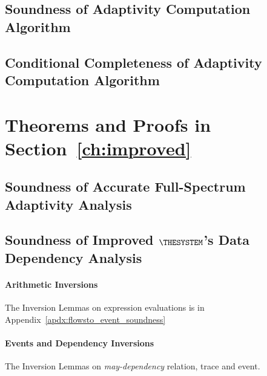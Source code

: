 \subsection{Soundness of Adaptivity Computation Algorithm}
\label{apdx:adaptalg_soundness}

\subsection{Conditional Completeness of Adaptivity Computation Algorithm}
\label{apdx:adaptalg_completeness}

\clearpage

\section{Theorems and Proofs in Section~\ref{ch:improved}}
\label{appendix:thm-improved}
\subsection{Soundness of Accurate Full-Spectrum Adaptivity Analysis}
\label{apdx:adapt_soundness_extend}


\clearpage
\subsection{Soundness of Improved $\THESYSTEM$'s Data Dependency Analysis}
\label{apdx:flowsto_soundness_extend}

\paragraph*{Arithmetic Inversions}
The Inversion Lemmas on expression evaluations is in Appendix~\ref{apdx:flowsto_event_soundness}
\paragraph*{Events and Dependency Inversions}
The Inversion Lemmas on \emph{may-dependency} relation, trace and event.

\clearpage
% 
